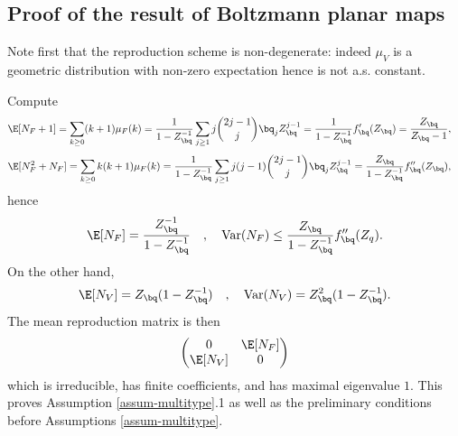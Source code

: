 \documentclass[10pt,a4paper]{article}
\DeclareMathOperator{\Var}{Var}
\newcommand{\repscheme}{reproduction scheme\xspace}
\begin{document}
\subsection{Proof of the result of Boltzmann planar maps}
\label{sec:prop-mobile}

Note first that the \repscheme is non-degenerate: indeed $\mu_V$ is a geometric distribution with non-zero expectation hence is not a.s. constant. 

Compute
\begin{align*}
\E[N_F+1] = \sum_{k\geq 0} (k+1) \mu_F(k) &= \frac{1}{1-Z_\bq^{-1}} \sum_{j\geq 1} j {{2j-1}\choose j} \bq_j Z_\bq^{j-1} 
= \frac{1}{1-Z_\bq^{-1}} f_\bq'(Z_\bq) = \frac{Z_\bq}{Z_\bq-1} ,%
\end{align*} 
\begin{align*}
\E[N_F^2 + N_F] = \sum_{k\geq 0} k(k+1) \mu_F(k) &= \frac{1}{1-Z_\bq^{-1}} \sum_{j\geq 1} j(j-1) {{2j-1}\choose j} \bq_j Z_\bq^{j-1} 
= \frac{Z_\bq}{1-Z_\bq^{-1}} f_\bq''(Z_\bq) ,
\end{align*} 
hence 
\[ \E[N_F] = \frac{Z_\bq^{-1}}{1-Z_\bq^{-1}} \quad , \quad \Var(N_F) \leq \frac{Z_\bq}{1-Z_\bq^{-1}} f_\bq''(Z_q). \]
On the other hand, 
\[ \E[N_V] = Z_\bq(1-Z_\bq^{-1}) \quad , \quad \Var(N_V) = Z_\bq^2(1-Z_\bq^{-1}) . \]
The mean reproduction matrix is then
\[ \left(\begin{matrix} 0 & \E[N_F] \\ \E[N_V] & 0 \end{matrix}\right) \]
which is irreducible, has finite coefficients, and has maximal eigenvalue $1$. This proves Assumption \ref{assum-multitype}.1 as well as the preliminary conditions before Assumptions \ref{assum-multitype}.
\end{document}
